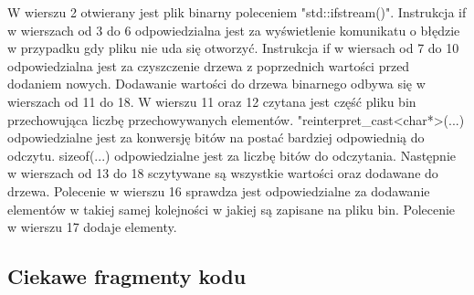 W wierszu 2 otwierany jest plik binarny poleceniem "std::ifstream()".
Instrukcja if w wierszach od 3 do 6 odpowiedzialna jest za wyświetlenie komunikatu o błędzie w przypadku gdy pliku nie uda się otworzyć.
Instrukcja if w wiersach od 7 do 10 odpowiedzialna jest za czyszczenie drzewa z poprzednich wartości przed dodaniem nowych.
Dodawanie wartości do drzewa binarnego odbywa się w wierszach od 11 do 18.
W wierszu 11 oraz 12 czytana jest część pliku bin przechowująca liczbę przechowywanych elementów. "reinterpret\_cast<char*>(...) odpowiedzialne jest za konwersję bitów na postać bardziej odpowiednią do odczytu. sizeof(...) odpowiedzialne jest za liczbę bitów do odczytania.
Następnie w wierszach od 13 do 18 sczytywane są wszystkie wartości oraz dodawane do drzewa. Polecenie w wierszu 16 sprawdza jest odpowiedzialne za dodawanie elementów w takiej samej kolejności w jakiej są zapisane na pliku bin. Polecenie w wierszu 17 dodaje elementy.

\subsection{Ciekawe fragmenty kodu}
